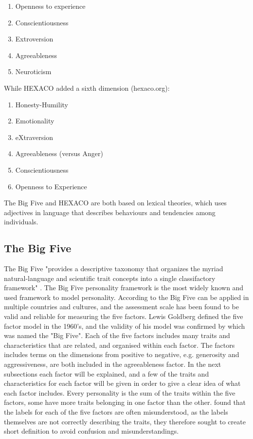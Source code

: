 \begin{enumerate}
    \item Openness to experience
    \item Conscientiousness
    \item Extroversion
    \item Agreeableness
    \item Neuroticism 
\end{enumerate}

While HEXACO added a sixth dimension (hexaco.org):
\begin{enumerate}
    \item Honesty-Humility
    \item Emotionality
    \item eXtraversion
    \item Agreeableness (versus Anger)
    \item Conscientiousness
    \item Openness to Experience
\end{enumerate}

The Big Five and HEXACO are both based on lexical theories, which uses adjectives in language that describes behaviours and tendencies among individuals. 

\vspace{2.5mm} %

\subsection{The Big Five}

The Big Five "provides a descriptive taxonomy that organizes the myriad natural-language and scientific trait concepts into a single classifactory framework" \citep{John1999}. The Big Five personality framework is the most widely known and used framework to model personality. According to \cite{Ackerman2017} the Big Five can be applied in multiple countries and cultures, and the assessment scale has been found to be valid and reliable for measuring the five factors. Lewis Goldberg defined the five factor model in the 1960's, and the validity of his model was confirmed by \cite{mccrae1987} which was named the "Big Five". Each of the five factors includes many traits and characteristics that are related, and organised within each factor. The factors  includes terms on the dimensions from positive to negative, e.g. generosity and aggressiveness, are both included in the agreeableness factor. In the next subsections each factor will be explained, and a few of the traits and characteristics for each factor will be given in order to give a clear idea of what each factor includes. Every personality is the sum of the traits within the five factors, some have more traits belonging in one factor than the other. \cite{John1999} found that the labels for each of the five factors are often misunderstood, as the labels themselves are not correctly describing the traits, they therefore sought to create short definition to avoid confusion and misunderstandings.

